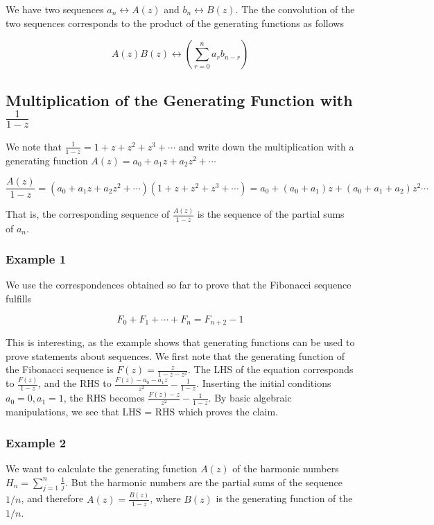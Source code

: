 We have two sequences $a_n \leftrightarrow A(z)$ and $b_n \leftrightarrow B(z)$. The the convolution of the two sequences corresponds to the product of the generating functions as follows

\[A(z) B(z) \leftrightarrow \left( \sum_{r=0}^n a_r b_{n-r} \right)\]

\subsection{Multiplication of the Generating Function with $\frac{1}{1-z}$}

We note that $\frac{1}{1-z} = 1 + z + z^2 + z^3 + \cdots$ and write down the multiplication with a generating function $A(z) = a_0 + a_1 z + a_2 z^2 + \cdots$

\[ \frac{A(z)}{1-z}  = (a_0 + a_1 z + a_2 z^2 + \cdots)(1 + z + z^2 + z^3 + \cdots) = a_0 + (a_0 + a_1)z + (a_0 + a_1 + a_2)z^2 \cdots \]

That is, the corresponding sequence of $\frac{A(z)}{1-z}$ is the sequence of the partial sums of $a_n$.

\subsubsection{Example 1}\label{example-1-1}

We use the correspondences obtained so far to prove that the Fibonacci
sequence fulfills

\[F_0 + F_1 + \cdots + F_n = F_{n+2} - 1\]

This is interesting, as the example shows that generating functions can be used to prove statements about sequences. We first note that the generating function of the Fibonacci sequence is $F(z) = \frac{z}{1-z-z^2}$. The LHS of the equation corresponds to $\frac{F(z)}{1-z}$, and the RHS to $\frac{F(z) - a_0 - a_1 z}{z^2} - \frac{1}{1-z}$. Inserting the initial conditions $a_0=0, a_1=1$, the RHS becomes $\frac{F(z) - z}{z^2} - \frac{1}{1-z}$. By basic algebraic manipulations, we see that LHS = RHS which proves the claim.

\subsubsection{Example 2}\label{example-2-1}

We want to calculate the generating function $A(z)$ of the harmonic numbers $H_n=\sum_{j=1}^n \frac{1}{j}$. But the harmonic numbers are the partial sums of the sequence $1/n$, and therefore $A(z) = \frac{B(z)}{1-z}$, where $B(z)$ is the generating function of the $1/n$.

